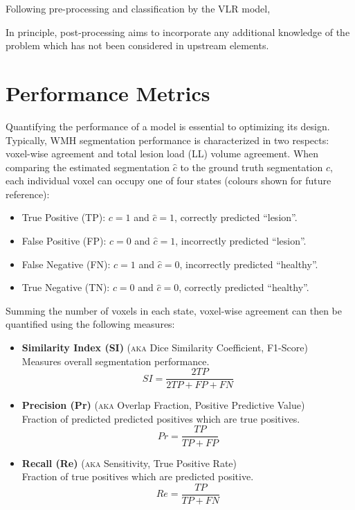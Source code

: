 Following pre-processing and classification by the VLR model, 

In principle, post-processing aims to incorporate any additional knowledge of the problem which has not been considered in upstream elements. 




\clearpage
\section{Performance Metrics}\label{ss:metrics}
Quantifying the performance of a model is essential to optimizing its design.
Typically, WMH segmentation performance is characterized in two respects: voxel-wise agreement and total lesion load (LL) volume agreement.
When comparing the estimated segmentation $\hat{c}$ to the ground truth segmentation $c$, each individual voxel can occupy one of four states (colours shown for future reference):
\begin{itemize}[itemsep=0pt,topsep=0pt]
  \item[\textcolor{green}{\scalebox{0.7}{$\blacksquare$}}] True Positive (TP): $c = 1$ and $\hat{c} = 1$, correctly predicted ``lesion''.
  \item[\textcolor{red}  {\scalebox{0.7}{$\blacksquare$}}] False Positive (FP): $c = 0$ and $\hat{c} = 1$, incorrectly predicted ``lesion''.
  \item[\textcolor{blue} {\scalebox{0.7}{$\blacksquare$}}] False Negative (FN): $c = 1$ and $\hat{c} = 0$, incorrectly predicted ``healthy''.
  \item[\textcolor{black}{\scalebox{0.7}{$\blacksquare$}}] True Negative (TN): $c = 0$ and $\hat{c} = 0$, correctly predicted ``healthy''.
\end{itemize}
Summing the number of voxels in each state, voxel-wise agreement can then be quantified using the following measures:
\begin{itemize}
  \item \textbf{Similarity Index (SI)}
  (\textsc{aka} Dice Similarity Coefficient, F1-Score)\\
  Measures overall segmentation performance.
  \begin{equation}SI = \dfrac{2TP}{2TP + FP + FN}\end{equation}
  \item \textbf{Precision (Pr)}
  (\textsc{aka} Overlap Fraction, Positive Predictive Value)\\
  Fraction of predicted predicted positives which are true positives.
  \begin{equation}Pr = \dfrac{TP}{TP+FP}\end{equation}
  \item \textbf{Recall (Re)}
  (\textsc{aka} Sensitivity, True Positive Rate)\\
  Fraction of true positives which are predicted positive.
  \begin{equation}Re = \dfrac{TP}{TP+FN}\end{equation}
\end{itemize}
